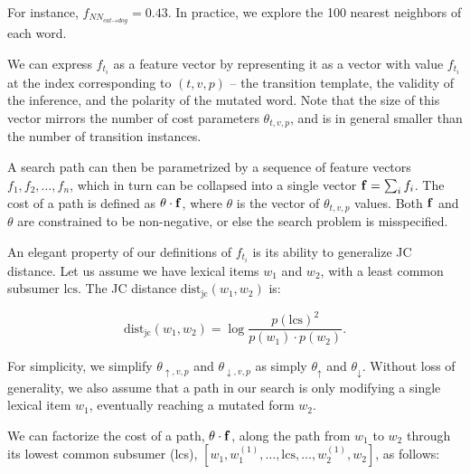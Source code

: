 For instance, $f_{NN_{\textit{cat} \rightarrow \textit{dog}}} = 0.43$.
In practice, we explore the 100 nearest neighbors of each word.

We can express $f_{t_i}$ as a feature vector by representing it as
  a vector with value $f_{t_i}$ at the index corresponding to
  $(t,v,p)$ -- the transition template, the validity of the inference,
  and the polarity of the mutated word.
Note that the size of this vector mirrors the number of cost
  parameters $\theta_{t,v,p}$, and is in general smaller than the
  number of transition instances.

A search path can then be parametrized by a sequence of feature vectors
  $f_1, f_2, \dots, f_n$, which in turn can be collapsed into a single
  vector $\mathbf{f} = \sum_i f_i$.
The cost of a path is defined as $\theta \cdot \mathbf{f}$, where
  $\theta$ is the vector of $\theta_{t,v,p}$ values.
Both $\mathbf{f}$ and $\theta$ are constrained to be non-negative, or else
  the search problem is misspecified.


%
%
An elegant property of our definitions of $f_{t_i}$ is its ability to
  generalize JC distance.
Let us assume we have lexical items $w_1$ and $w_2$, with a least common 
  subsumer $\textrm{lcs}$.
The JC distance $\textrm{dist}_{\textrm{jc}}(w_1, w_2)$ is:

\begin{equation}
\textrm{dist}_{\textrm{jc}}(w_1, w_2)
  = \log\frac{p(\textrm{lcs})^2}{p(w_1) \cdot p(w_2)}.
\label{eqn:jc}
\end{equation}

For simplicity, we simplify $\theta_{\uparrow,v,p}$ and $\theta_{\downarrow,v,p}$
  as simply $\theta_\uparrow$ and $\theta_\downarrow$.
Without loss of generality, we also assume that a path in our search
  is only modifying a single lexical item $w_1$, eventually 
  reaching a mutated form $w_2$.

We can factorize the cost of a path, $\theta \cdot \mathbf{f}$, along the path
  from $w_1$ to $w_2$ through its lowest common subsumer (lcs),
  $[w_1, w_1^{(1)}, \dots, \textrm{lcs}, \dots,  w_2^{(1)}, w_2]$,
  as follows:

